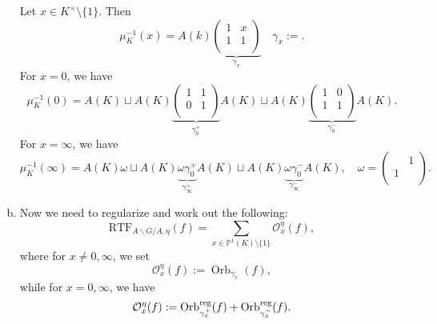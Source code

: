\documentclass[reqno]{amsart} 
\numberwithin{theorem}{section}
\numberwithin{equation}{section}
\numberwithin{exercise}{section}
\begin{document}
\begin{enumerate}[(a)]
\begin{notation}
  \end{notation}
  \begin{exercise}\label{exercise:cq6tydnqrq}
    Let $x \in K^\times \setminus \{1\}$.  Then
    \begin{equation*}
      \mu_K^{-1}(x) = A(k)
      \underbrace
      {
        \begin{pmatrix}
          1      & x \\
          1 & 1 \\
        \end{pmatrix}
      }_{
        \gamma_x
      }
      \quad
      \gamma_x := .
    \end{equation*}
    For $x = 0$, we have
    \begin{equation*}
      \mu_K^{-1}(0) =
      A(K)
      \sqcup A(K)
      \underbrace
      {
        \begin{pmatrix}
          1        & 1 \\
          0 & 1 \\
        \end{pmatrix}
      }_{
        \gamma_0^+
      }
      A(K) \sqcup A(K)
      \underbrace
      {
        \begin{pmatrix}
          1        & 0 \\
          1                 & 1 \\
        \end{pmatrix}
      }_{
        \gamma_0^-
      }
      A(K).
    \end{equation*}
    For $x = \infty$, we have
    \begin{equation*}
      \mu_K^{-1}(\infty) = A(K) \omega \sqcup A(K) \underbrace
      {
        \omega \gamma_0^+ 
      }_{
        \gamma_\infty^+
      }
      A(K) \sqcup A(K) \underbrace
      {
        \omega \gamma_0^- 
      }_{
        \gamma_\infty^-
      }
      A(K),
      \quad  \omega =
      \begin{pmatrix}
        & 1 \\
        1 &  \\
      \end{pmatrix}.
    \end{equation*}
  \end{exercise}
\item\label{enumerate:cq6tydex7z} Now we need to regularize and work out the following:
  \begin{equation*}
    \mathrm{RTF}_{A \backslash G / A, \eta}(f) = \sum_{x \in \mathbb{P}^1(K) \setminus \{1\}} \mathcal{O}_x^\eta(f),
  \end{equation*}
  where for $x \neq 0, \infty$, we set
  \begin{equation*}
    \mathcal{O}_x^\eta(f) := \operatorname{Orb}_{\gamma_x}(f),
  \end{equation*}
  while for $x = 0, \infty$, we have
  \begin{equation*}
    \mathcal{O}_x^\eta(f) := \operatorname{Orb}_{\gamma_x^+}^{\operatorname{reg}}(f) + \operatorname{Orb}_{\gamma_x^-}^{\operatorname{reg}}(f).
  \end{equation*}  
\end{enumerate}
\end{document}
